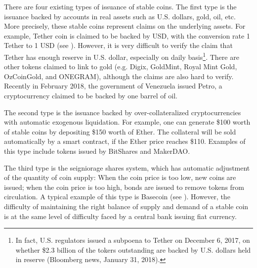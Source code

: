 \documentclass[draft, noinfoline]{ectaart}
\numberwithin{equation}{section}
\theoremstyle{plain}
\begin{document}




There are four existing types of issuance of stable coins. The first type is the issuance backed by accounts in real assets such as U.S. dollars, gold, oil, etc. More precisely, these stable coins represent claims on the underlying assets. For example, Tether coin is claimed to be backed by USD, with the conversion rate  1 Tether to 1 USD (see \cite{tether_tether:_2016}). However, it is very difficult to verify the claim that Tether has enough reserve in U.S. dollar, especially on daily basis\footnote{
In fact, U.S. regulators issued a subpoena to Tether on December 6, 2017, on whether \$2.3 billion of the tokers outstanding are backed by U.S. dollars held in reserve (Bloomberg news, January 31, 2018).}.
There are other tokens claimed to link to gold (e.g. Digix, GoldMint, Royal Mint Gold, OzCoinGold, and ONEGRAM), although the claims are also hard to verify. Recently in February 2018, the government of Venezuela issued Petro, a cryptocurrency claimed to be backed by one barrel of oil.

The second type is the issuance backed by over-collateralized cryptocurrencies with automatic exogenous liquidation. For example, one can generate \$100 worth of stable coins by depositing \$150 worth of Ether. The collateral will be sold automatically by a smart contract, if the Ether price reaches \$110. Examples of this type include tokens issued by BitShares and MakerDAO.

The third type is the seigniorage shares system, which has automatic adjustment of the quantity of coin supply: When the coin price is too low, new coins are issued; when the coin price is too high, bonds are issued to remove tokens from circulation. A typical example of this type is Basecoin (see \cite{al-naji_basecoin:_2018}). However, the difficulty of maintaining the right balance of supply and demand of a stable coin is at the same level of difficulty faced by a central bank issuing fiat currency.
\end{document}
